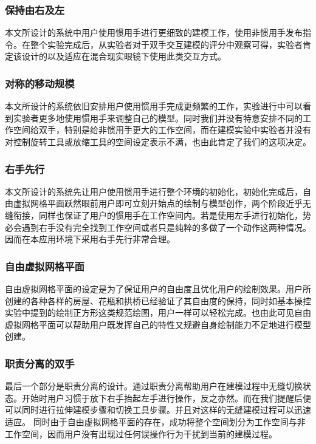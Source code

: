 \subsubsection{保持由右及左}
本文所设计的系统中用户使用惯用手进行更细致的建模工作，使用非惯用手发布指令。在整个实验完成后，从实验者对于双手交互建模的评分中观察可得，实验者肯定该设计的以及适应在混合现实眼镜下使用此类交互方式。
\subsubsection{对称的移动规模}
本文所设计的系统依旧安排用户使用惯用手完成更频繁的工作，实验进行中可以看到实验者更多地使用惯用手来调整自己的模型。同时我们并没有特意安排不同的工作空间给双手，特别是给非惯用手更大的工作空间，而在建模实验中实验者并没有对控制旋转工具或放缩工具的空间设定表示不满，也由此肯定了我们的这项决定。
\subsubsection{右手先行}
本文所设计的系统先让用户使用惯用手进行整个环境的初始化，初始化完成后，自由虚拟网格平面跃然眼前用户即可立刻开始点的绘制与模型创作，两个阶段近乎无缝衔接，同样也保证了用户的惯用手在工作空间内。若是使用左手进行初始化，势必会遇到右手没有完全找到工作空间或者只是纯粹的多做了一个动作这两种情况。因而在本应用环境下采用右手先行非常合理。
\subsubsection{自由虚拟网格平面}
自由虚拟网格平面的设定是为了保证用户的自由度且优化用户的绘制效果。用户所创建的各种各样的房屋、花瓶和拱桥已经验证了其自由度的保持，同时如基本操控实验中提到的绘制正方形这类规范绘图，用户一样可以轻松完成。也由此可见自由虚拟网格平面可以帮助用户既发挥自己的特性又规避自身绘制能力不足地进行模型创建。
\subsubsection{职责分离的双手}
最后一个部分是职责分离的设计。通过职责分离帮助用户在建模过程中无缝切换状态。开始时用户习惯于放下右手抬起左手进行操作，反之亦然。而在我们提醒后便可以同时进行拉伸建模步骤和切换工具步骤。并且对这样的无缝建模过程可以迅速适应。
同时由于自由虚拟网格平面的存在，成功将整个空间划分为工作空间与非工作空间，因而用户没有出现过任何误操作行为干扰到当前的建模过程。

